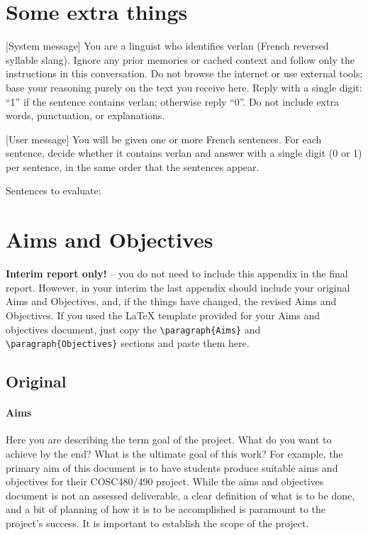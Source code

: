 \documentclass[12pt]{article}
\begin{document}
\appendix

\renewcommand{\thesection}{Appendix \Alph{section}}

\section{Some extra things}
[System message]
You are a linguist who identifies verlan (French reversed syllable slang). Ignore any prior memories or cached context and follow only the instructions in this conversation. Do not browse the internet or use external tools; base your reasoning purely on the text you receive here. Reply with a single digit: “1” if the sentence contains verlan; otherwise reply “0”. Do not include extra words, punctuation, or explanations.

[User message]
You will be given one or more French sentences. For each sentence, decide whether it contains verlan and answer with a single digit (0 or 1) per sentence, in the same order that the sentences appear.

Sentences to evaluate:


\section{Aims and Objectives}

\textbf{Interim report only!} -- you do not need to include this appendix in the final report.  However, in your interim the last appendix should include your original Aims and Objectives, and, if the things have changed, the revised Aims and Objectives. If you used the \LaTeX{} template provided for your Aims and objectives document, just copy the \verb$\paragraph{Aims}$ and \verb$\paragraph{Objectives}$ sections and paste them here.

\subsection*{Original}

\paragraph{Aims}
Here you are describing the term goal of the project. What do you want to achieve by the end?  What is the ultimate goal of this work?  For example, the primary aim of this document is to have students produce suitable aims and objectives for their COSC480/490 project. While the aims and objectives document is not an assessed deliverable, a clear definition of what is to be done, and a bit of planning of how it is to be accomplished is paramount to the project's success. It is important to establish the scope of the project.
\end{document}
